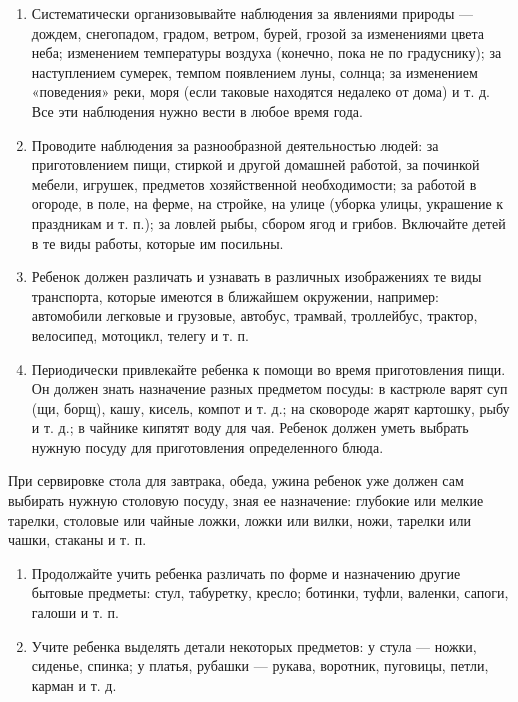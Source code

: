 \documentclass{book}
\begin{document}
\begin{enumerate}
\def\labelenumi{\arabic{enumi}.}
\setcounter{enumi}{1}
\item
  
  Систематически организовывайте наблюдения за явлениями природы ---
  дождем, снегопадом, градом, ветром, бурей, грозой за изменениями цвета
  неба; изменением температуры воздуха (конечно, пока не по градуснику);
  за наступлением сумерек, темпом появлением луны, солнца; за изменением
  «поведения» реки, моря (если таковые находятся недалеко от дома) и т.
  д. Все эти наблюдения нужно вести в любое время года.
  
\item
  
  Проводите наблюдения за разнообразной деятельностью людей: за
  приготовлением пищи, стиркой и другой домашней работой, за починкой
  мебели, игрушек, предметов хозяйственной необходимости; за работой в
  огороде, в поле, на ферме, на стройке, на улице (уборка улицы,
  украшение к праздникам и т. п.); за ловлей рыбы, сбором ягод и грибов.
  Включайте детей в те виды работы, которые им посильны.
  
\item
  
  Ребенок должен различать и узнавать в различных изображениях те виды
  транспорта, которые имеются в ближайшем окружении, например:
  автомобили легковые и грузовые, автобус, трамвай, троллейбус, трактор,
  велосипед, мотоцикл, телегу и т. п.
  
\item
  
  Периодически привлекайте ребенка к помощи во время приготовления пищи.
  Он должен знать назначение разных предметом посуды: в кастрюле варят
  суп (щи, борщ), кашу, кисель, компот и т. д.; на сковороде жарят
  картошку, рыбу и т. д.; в чайнике кипятят воду для чая. Ребенок должен
  уметь выбрать нужную посуду для приготовления определенного блюда.
  
\end{enumerate}


При сервировке стола для завтрака, обеда, ужина ребенок уже должен сам
выбирать нужную столовую посуду, зная ее назначение: глубокие или мелкие
тарелки, столовые или чайные ложки, ложки или вилки, ножи, тарелки или
чашки, стаканы и т. п.


\begin{enumerate}
\def\labelenumi{\arabic{enumi}.}
\setcounter{enumi}{5}
\item
  
  Продолжайте учить ребенка различать по форме и назначению другие
  бытовые предметы: стул, табуретку, кресло; ботинки, туфли, валенки,
  сапоги, галоши и т. п.
  
\item
  
  Учите ребенка выделять детали некоторых предметов: у стула --- ножки,
  сиденье, спинка; у платья, рубашки --- рукава, воротник, пуговицы,
  петли, карман и т. д.
  
\end{enumerate}
\end{document}

